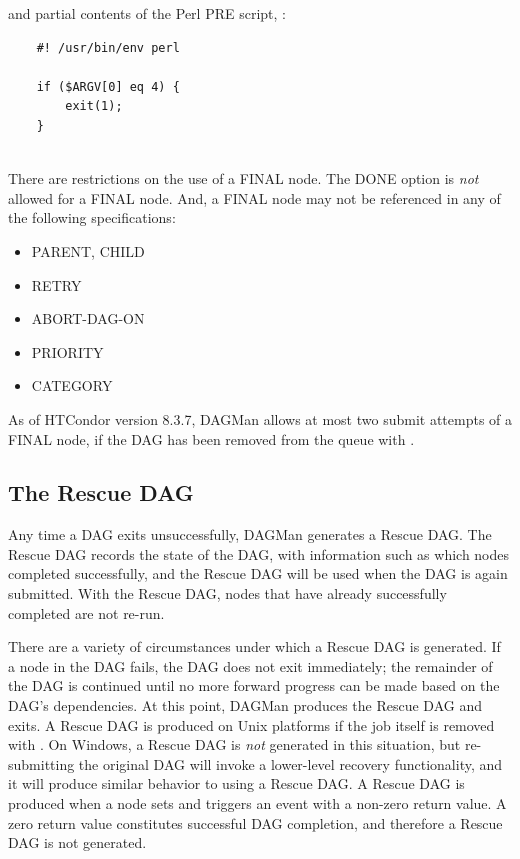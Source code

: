and partial contents of the Perl PRE script, :
\begin{verbatim}
    #! /usr/bin/env perl
    
    if ($ARGV[0] eq 4) {
        exit(1);
    }
   
\end{verbatim}


There are restrictions on the use of a FINAL node.
The DONE option is \emph{not} allowed for a FINAL node.
And, a FINAL node may not be referenced in any of the following
specifications:
\begin{itemize}
\item PARENT, CHILD
\item RETRY
\item ABORT-DAG-ON
\item PRIORITY
\item CATEGORY
\end{itemize}

As of HTCondor version 8.3.7, DAGMan allows at most two submit attempts
of a FINAL node,
if the DAG has been removed from the queue with .

\subsection{\label{sec:DAGMan-rescue}The Rescue DAG}

Any time a DAG exits unsuccessfully, DAGMan generates a Rescue DAG.  
The Rescue DAG records the state of the DAG, 
with information such as which nodes completed successfully,
and the Rescue DAG will be used when the DAG is again submitted.
With the Rescue DAG,
nodes that have already successfully completed are not re-run.

There are a variety of circumstances under which a Rescue DAG
is generated.
If a node in the DAG fails, the DAG does not exit immediately;
the remainder of the DAG is continued until no more forward
progress can be made based on the DAG's dependencies.
At this point, DAGMan produces the Rescue DAG and exits.
A Rescue DAG is produced on Unix platforms if the
 job itself is removed with .
On Windows, a Rescue DAG is \emph{not} generated in this situation,
but re-submitting the original DAG will invoke a lower-level 
recovery functionality,
and it will produce similar behavior to using a Rescue DAG.
A Rescue DAG is produced when a node sets and triggers
an  event with a non-zero return value.
A zero return value constitutes successful DAG completion, 
and therefore a Rescue DAG is not generated.

